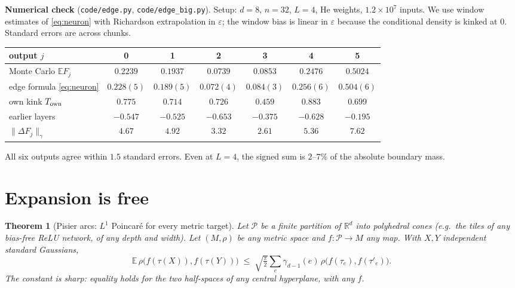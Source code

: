\documentclass[11pt]{article}
\newtheorem{theorem}{Theorem}[section]
\theoremstyle{definition}
\theoremstyle{remark}
\newcommand{\R}{\mathbb R}
\newcommand{\E}{\mathbb E}
\begin{document}
\textbf{Numerical check} (\texttt{code/edge.py}, \texttt{code/edge\_big.py}). Setup: $d=8$, $n=32$, $L=4$, He weights, $1.2\times10^7$ inputs. We use window estimates of \eqref{eq:neuron} with Richardson extrapolation in $\varepsilon$; the window bias is linear in $\varepsilon$ because the conditional density is kinked at $0$. Standard errors are across chunks.
\begin{center}\small
\begin{tabular}{lcccccc}
\toprule
output $j$ & 0 & 1 & 2 & 3 & 4 & 5\\
\midrule
Monte Carlo $\E F_j$ & $0.2239$ & $0.1937$ & $0.0739$ & $0.0853$ & $0.2476$ & $0.5024$\\
edge formula \eqref{eq:neuron} & $0.228(5)$ & $0.189(5)$ & $0.072(4)$ & $0.084(3)$ & $0.256(6)$ & $0.504(6)$\\
own kink $T_{\rm own}$ & $0.775$ & $0.714$ & $0.726$ & $0.459$ & $0.883$ & $0.699$\\
earlier layers & $-0.547$ & $-0.525$ & $-0.653$ & $-0.375$ & $-0.628$ & $-0.195$\\
$\|\Delta F_j\|_\gamma$ & $4.67$ & $4.92$ & $3.32$ & $2.61$ & $5.36$ & $7.62$\\
\bottomrule
\end{tabular}
\end{center}
All six outputs agree within $1.5$ standard errors. Even at $L=4$, the signed sum is $2$--$7\%$ of the absolute boundary mass.

\section{Expansion is free}

\begin{theorem}[Pisier arcs: $L^1$ Poincar\'e for every metric target]\label{thm:arc}
Let $\mathcal P$ be a finite partition of $\R^d$ into polyhedral cones (e.g.\ the tiles of any bias-free ReLU network, of any depth and width). Let $(M,\rho)$ be any metric space and $f:\mathcal P\to M$ any map. With $X,Y$ independent standard Gaussians,
\begin{equation}\label{eq:arc}
\E\,\rho\big(f(\tau(X)),f(\tau(Y))\big)\;\le\;\sqrt{\tfrac\pi2}\sum_{e}\gamma_{d-1}(e)\,\rho\big(f(\tau_e),f(\tau'_e)\big).
\end{equation}
The constant is sharp: equality holds for the two half-spaces of any central hyperplane, with any $f$.
\end{theorem}
\end{document}
